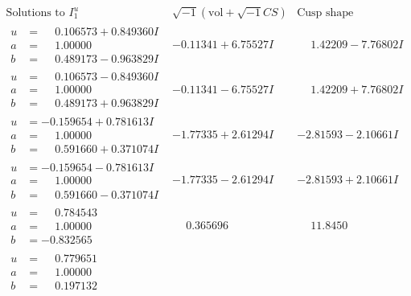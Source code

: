 \documentclass[1p]{elsarticle_modified}
\theoremstyle{definition}
\newcommand{\I}{\sqrt{-1}}
\begin{document}
$$\begin{array}{c|c|c}  
\text{Solutions to }I^u_{1}& \I (\text{vol} + \sqrt{-1}CS) & \text{Cusp shape}\\
 \hline 
\begin{aligned}
u &= \phantom{-}0.106573 + 0.849360 I \\
a &= \phantom{-}1.00000\phantom{ +0.000000I} \\
b &= \phantom{-}0.489173 - 0.963829 I\end{aligned}
 & -0.11341 + 6.75527 I & \phantom{-}1.42209 - 7.76802 I \\ \hline\begin{aligned}
u &= \phantom{-}0.106573 - 0.849360 I \\
a &= \phantom{-}1.00000\phantom{ +0.000000I} \\
b &= \phantom{-}0.489173 + 0.963829 I\end{aligned}
 & -0.11341 - 6.75527 I & \phantom{-}1.42209 + 7.76802 I \\ \hline\begin{aligned}
u &= -0.159654 + 0.781613 I \\
a &= \phantom{-}1.00000\phantom{ +0.000000I} \\
b &= \phantom{-}0.591660 + 0.371074 I\end{aligned}
 & -1.77335 + 2.61294 I & -2.81593 - 2.10661 I \\ \hline\begin{aligned}
u &= -0.159654 - 0.781613 I \\
a &= \phantom{-}1.00000\phantom{ +0.000000I} \\
b &= \phantom{-}0.591660 - 0.371074 I\end{aligned}
 & -1.77335 - 2.61294 I & -2.81593 + 2.10661 I \\ \hline\begin{aligned}
u &= \phantom{-}0.784543\phantom{ +0.000000I} \\
a &= \phantom{-}1.00000\phantom{ +0.000000I} \\
b &= -0.832565\phantom{ +0.000000I}\end{aligned}
 & \phantom{-}0.365696\phantom{ +0.000000I} & \phantom{-}11.8450\phantom{ +0.000000I} \\ \hline\begin{aligned}
u &= \phantom{-}0.779651\phantom{ +0.000000I} \\
a &= \phantom{-}1.00000\phantom{ +0.000000I} \\
b &= \phantom{-}0.197132\phantom{ +0.000000I}\end{aligned}

\end{array}$$
\end{document}
